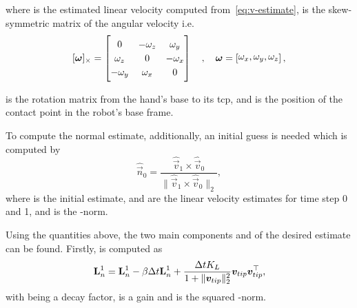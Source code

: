 where  is the estimated linear velocity computed from~\ref{eq:v-estimate},  is the skew-symmetric matrix of the angular velocity  i.e.
%
\begin{equation} \label{eq:skew-symmetric-matrix}
	[\bm{\omega}]_\times = 
	\begin{bmatrix}
		0 & -\omega_z & \omega_y \\ \omega_z & 0 & -\omega_x \\ -\omega_y & \omega_x & 0
	\end{bmatrix} \quad , \quad \bm{\omega} = \rvec{\omega_x, \omega_y, \omega_z},
\end{equation}

 is the rotation matrix from the hand's base to its \gls{tcp}, and  is the position of the contact point in the robot's base frame. \medskip

To compute the normal estimate, additionally, an initial guess is needed which is computed by
%
\begin{equation} \label{eq:def-n-init}
	\hat{\vec{n}}_{0} = \frac{\hat{\vec{v}}_{1} \times \hat{\vec{v}}_{0}}{\| \hat{\vec{v}}_{1} \times \hat{\vec{v}}_{0} \|_2},
\end{equation}
where  is the initial estimate,  and  are the linear velocity estimates for time step \num{0} and \num{1}, and  is the -norm. \medskip

Using the quantities above, the two main components  and  of the desired estimate  can be found. Firstly,  is computed as
%
\begin{equation} \label{eq:def-L-n-1}
	\bm{\mathrm{L}}_n^1 = \bm{\mathrm{L}}_n^1 - \beta \Delta t \bm{\mathrm{L}}_n^1 + \frac{\Delta t K_L}{1+\|\bm{v}_{tip}\|_2^2} \bm{v}_{tip} \bm{v}_{tip}^\top,
\end{equation}
with \mvar{\beta\inR{}} being a decay factor,  is a gain and  is the squared -norm. \medskip

